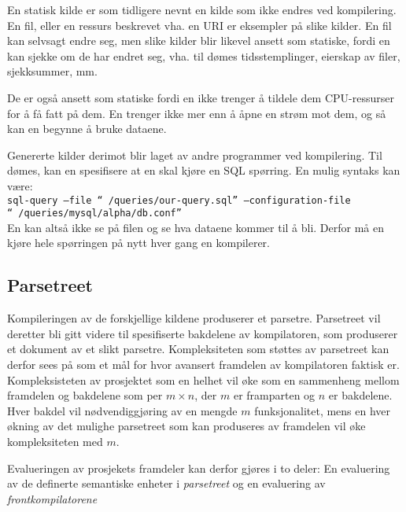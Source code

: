 En statisk kilde er som tidligere nevnt en kilde som ikke endres ved kompilering. En fil, eller en ressurs beskrevet vha. en URI er eksempler på slike kilder.
En fil kan selvsagt endre seg, men slike kilder blir likevel ansett som statiske, fordi en kan sjekke om de har endret seg, vha. til dømes tidsstemplinger, eierskap av filer, sjekksummer, mm.

De er også ansett som statiske fordi en ikke trenger å tildele dem CPU-ressurser for å få fatt på dem. En trenger ikke mer enn å åpne en strøm mot dem, og så kan en begynne å bruke dataene.

Genererte kilder derimot blir laget av andre programmer ved kompilering.
Til dømes, kan en spesifisere at en skal kjøre en SQL spørring.
En mulig syntaks kan være: \\
\texttt{sql-query --file ``~/queries/our-query.sql'' --configuration-file ``~/queries/mysql/alpha/db.conf''} \\
En kan altså ikke se på filen og se hva dataene kommer til å bli.
Derfor må en kjøre hele spørringen på nytt hver gang en kompilerer.

\subsection{Parsetreet}
\label{subsec:evaluering-parsetreet}

Kompileringen av de forskjellige kildene produserer et parsetre.
Parsetreet vil deretter bli gitt videre til spesifiserte bakdelene av kompilatoren,
som produserer et dokument av et slikt parsetre.
Kompleksiteten som støttes av parsetreet kan derfor sees på som et mål for hvor avansert framdelen av
kompilatoren faktisk er.
Kompleksisteten av prosjektet som en helhet vil øke som en sammenheng mellom framdelen og bakdelene som per $m \times n$, der $m$ er framparten og $n$ er bakdelene.
Hver bakdel vil nødvendiggjøring av en mengde $m$ funksjonalitet, mens en hver økning av det mulighe parsetreet som kan produseres av framdelen vil øke kompleksiteten med $m$.

Evalueringen av prosjekets framdeler kan derfor gjøres i to deler: En evaluering av de definerte semantiske enheter i \emph{parsetreet} og en evaluering av \emph{frontkompilatorene}

